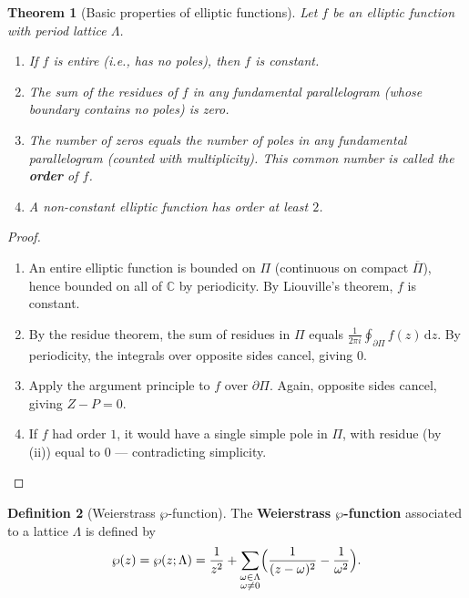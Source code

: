 \documentclass[12pt,a4paper,openany]{book}
\theoremstyle{definition}
\newtheorem{definition}{Definition}[chapter]
\theoremstyle{plain}
\newtheorem{theorem}[definition]{Theorem}
\theoremstyle{remark}
\newcommand{\C}{\mathbb{C}}
\newcommand{\dd}{\mathrm{d}}
\begin{document}
\begin{theorem}[Basic properties of elliptic functions]\label{thm:elliptic-basic}
Let $f$ be an elliptic function with period lattice $\Lambda$.
\begin{enumerate}[label=(\roman*)]
  \item If $f$ is entire (i.e., has no poles), then $f$ is constant.
  \item The sum of the residues of $f$ in any fundamental parallelogram
    (whose boundary contains no poles) is zero.
  \item The number of zeros equals the number of poles in any fundamental
    parallelogram (counted with multiplicity). This common number is
    called the \textbf{order} of $f$.
  \item A non-constant elliptic function has order at least $2$.
\end{enumerate}
\end{theorem}

\begin{proof}
\begin{enumerate}[label=(\roman*)]
  \item An entire elliptic function is bounded on $\Pi$ (continuous on
    compact $\overline{\Pi}$), hence bounded on all of $\C$ by periodicity.
    By Liouville's theorem, $f$ is constant.
  \item By the residue theorem, the sum of residues in $\Pi$ equals
    $\frac{1}{2\pi i}\oint_{\partial \Pi} f(z)\,\dd z$. By periodicity,
    the integrals over opposite sides cancel, giving $0$.
  \item Apply the argument principle to $f$ over $\partial \Pi$.
    Again, opposite sides cancel, giving $Z - P = 0$.
  \item If $f$ had order $1$, it would have a single simple pole in $\Pi$,
    with residue (by (ii)) equal to $0$ — contradicting simplicity. \qedhere
\end{enumerate}
\end{proof}

\begin{definition}[Weierstrass $\wp$-function]\label{def:weierstrass-pe}
The \textbf{Weierstrass $\wp$-function} associated to a lattice
$\Lambda$ is defined by
\[
  \wp(z) = \wp(z; \Lambda)
  = \frac{1}{z^2} + \sum_{\substack{\omega \in \Lambda \\ \omega \neq 0}}
  \Bigl(\frac{1}{(z-\omega)^2} - \frac{1}{\omega^2}\Bigr).
\]
\end{definition}
\end{document}

